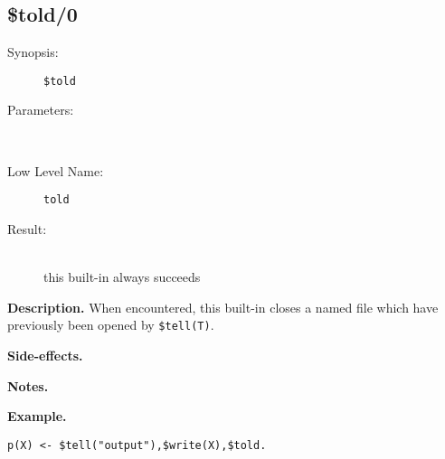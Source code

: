 %
%
%
\subsection{\$told/0}

\begin{description}
\item[Synopsis:]
	{\tt \$told}
\item[Parameters:]\ \\[-0.5cm]
\item[Low Level Name:]
	{\tt told}
\item[Result:]\ \\
this built-in always succeeds
\end{description}

\vspace*{0.5cm}
\noindent
{\bf Description.}
When encountered, this built-in closes a named file which have previously
been opened by {\tt \$tell(T)}.

\vspace*{0.5cm}
\noindent
{\bf Side-effects.}

\vspace*{0.5cm}
\noindent
{\bf Notes.}

\vspace*{0.5cm}
\noindent
{\bf Example.}
\begin{verbatim}
p(X) <- $tell("output"),$write(X),$told.
\end{verbatim}


